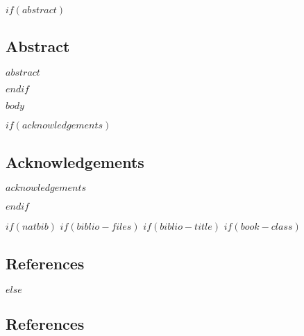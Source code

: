 \documentclass[final]{beamer}
\title
\author{ %
$if(author)$
$for(author)$
$author.name$\inst{$author.affiliation-label$}$sep$ \and $endfor$
$endif$
}
\institute{
$for(author)$
\inst{$author.affiliation-label$} $author.affiliation$
$endfor$
}
\date{$date$}
\begin{document}
\begin{frame}[t]
\begin{multicols}{3}


$if(abstract)$
\subsection{Abstract}

$abstract$

$endif$





$body$



$if(acknowledgements)$
\subsection{Acknowledgements}

$acknowledgements$

$endif$



$if(natbib)$
$if(biblio-files)$
$if(biblio-title)$
$if(book-class)$
\subsection{References}

\renewcommand\bibname{$biblio-title$}
$else$
\subsection{References}


\end{multicols}
\end{frame}
\end{document}

